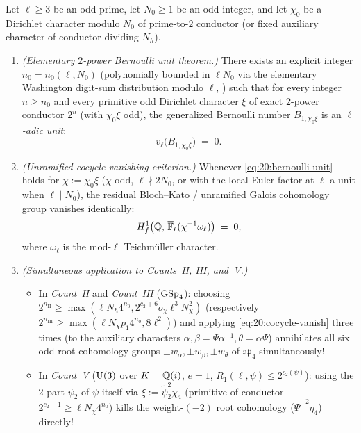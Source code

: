 
\begin{theorem}
\label{thm:20:bernoulli-units}
Let $\ell \ge 3$ be an odd prime, let $N_0 \ge 1$ be an odd integer, and let $\chi_0$ be a Dirichlet character modulo $N_0$ of prime-to-$2$ conductor (or fixed auxiliary character of conductor dividing $N_h$).
\begin{enumerate}[label=\textup{(\roman*)}]
\item \emph{(Elementary $2$-power Bernoulli unit theorem.)} There exists an explicit integer $n_0 = n_0(\ell, N_0)$ (polynomially bounded in $\ell N_0$ via the elementary Washington digit-sum distribution modulo $\ell$, \cite{Washington1997}) such that for every integer $n \ge n_0$ and every primitive odd Dirichlet character $\xi$ of exact $2$-power conductor $2^n$ (with $\chi_0 \xi$ odd), the generalized Bernoulli number $B_{1, \chi_0 \xi}$ is an \emph{$\ell$-adic unit}:
  \begin{equation}
  \label{eq:20:bernoulli-unit}
    v_\ell\bigl(B_{1, \chi_0 \xi}\bigr) \;=\; 0.
  \end{equation}
\item \emph{(Unramified cocycle vanishing criterion.)} Whenever \eqref{eq:20:bernoulli-unit} holds for $\chi := \chi_0 \xi$ ($\chi$ odd, $\ell \nmid 2 N_0$, or with the local Euler factor at $\ell$ a unit when $\ell \mid N_0$), the residual Bloch--Kato / unramified Galois cohomology group vanishes identically:
  \begin{equation}
  \label{eq:20:cocycle-vanish}
    H^1_f\bigl(\mathbb{Q},\, \overline{\mathbb{F}}_\ell(\chi^{-1}\omega_\ell)\bigr) \;=\; 0,
  \end{equation}
  where $\omega_\ell$ is the mod-$\ell$ Teichm\"uller character.
\item \emph{(Simultaneous application to Counts~II, III, and~V.)}
  \begin{itemize}
  \item In \emph{Count~II} and \emph{Count~III} ($\mathrm{GSp}_4$): choosing $2^{n_{\mathrm{II}}} \ge \max(\ell N_h 4^{n_0}, 2^{c_2+6} o_\chi \ell^3 N_\chi^2)$ (respectively $2^{n_{\mathrm{III}}} \ge \max(\ell N_\chi p_1 4^{n_0}, 8\ell^2)$) and applying \eqref{eq:20:cocycle-vanish} three times (to the auxiliary characters $\alpha, \beta = \Psi\alpha^{-1}, \theta = \alpha\Psi$) annihilates all six odd root cohomology groups $\pm w_\alpha, \pm w_\beta, \pm w_\theta$ of $\mathfrak{sp}_4$ simultaneously!
  \item In \emph{Count~V} ($\mathrm{U}(3)$ over $K = \mathbb{Q}(i)$, $e = 1$, $R_1(\ell, \psi) \le 2^{c_2(\psi)}$): using the $2$-part $\psi_2$ of $\psi$ itself via $\xi := \widetilde{\psi}_2^2 \chi_4$ (primitive of conductor $2^{c_2 - 1} \ge \ell N_\chi 4^{n_0}$) kills the weight-$(-2)$ root cohomology ($\bar{\Psi}^{-2}\eta_4$) directly!
  \end{itemize}
\end{enumerate}
\end{theorem}
